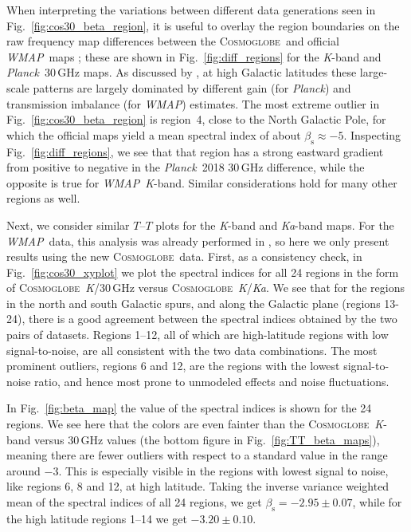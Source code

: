 \documentclass[twocolumn]{../../common/aa}
\def\WMAP{\emph{WMAP}}
\def\wmap{\emph{WMAP}}
\def\Planck{\emph{Planck}}
\newcommand{\cosmoglobe}{\textsc{Cosmoglobe}}
\newcommand{\K}[0]{\textit K}
\newcommand{\Ka}[0]{\textit{Ka}}
\begin{document}
When interpreting the variations between different data generations seen in Fig.~\ref{fig:cos30_beta_region}, it is useful to overlay the region boundaries on the raw frequency map differences between the \cosmoglobe\ and official \WMAP\ maps \citep{watts2023_dr1}; these are shown in Fig.~\ref{fig:diff_regions} for the \K-band and \Planck\ 30\,GHz maps. As discussed by \citet{watts2023_dr1}, at high Galactic latitudes these large-scale patterns are largely dominated by different gain (for \Planck) and transmission imbalance (for \WMAP) estimates. The most extreme outlier in Fig.~\ref{fig:cos30_beta_region} is region~4, close to the North Galactic Pole, for which the official maps yield a mean spectral index of about $\beta_{\mathrm{s}} \approx -5$. Inspecting Fig.~\ref{fig:diff_regions}, we see that that region has a strong eastward gradient from positive to negative in the \Planck\ 2018 30\,GHz difference, while the opposite is true for \WMAP\ \K-band. Similar considerations hold for many other regions as well. 

Next, we consider similar $T$--$T$ plots for the \K-band and \Ka-band maps. For the \wmap\ data, this analysis was already performed in  \citet{fuskeland2014}, so here we only present results using the new \cosmoglobe\ data. First, as a consistency check, in Fig.~\ref{fig:cos30_xyplot} we plot the spectral indices for all 24 regions in the form of \cosmoglobe\ \K/30\,GHz versus \cosmoglobe\ \K/\Ka. We see that for the regions in the north and south Galactic spurs, and along the Galactic plane (regions 13-24), there is a good agreement between the spectral indices obtained by the two pairs of datasets. Regions 1--12, all of which are high-latitude regions with low signal-to-noise, are all consistent with the two data combinations. The most prominent outliers, regions 6 and 12, are the regions with the lowest signal-to-noise ratio, and hence most prone to unmodeled effects and noise fluctuations.

In Fig.~\ref{fig:beta_map} the value of the spectral indices is shown for the 24 regions. We see here that the colors are even fainter than the \cosmoglobe\ \K-band versus 30\,GHz values (the bottom figure in Fig.~\ref{fig:TT_beta_maps}), meaning there are fewer outliers with respect to a standard value in the range around $-3$. This is especially visible in the regions with lowest signal to noise, like regions 6, 8 and 12, at high latitude. Taking the inverse variance weighted mean of the spectral indices of all 24 regions, we get $\beta_{\mathrm{s}}=-2.95\pm0.07$, while for the high latitude regions 1--14 we get $-3.20\pm0.10$.
\end{document}
